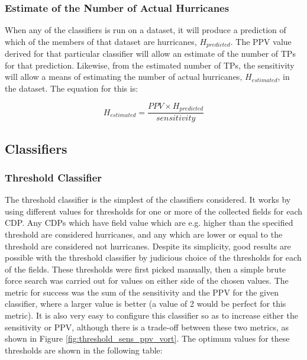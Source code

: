 \documentclass[pdftex,12pt,a4paper]{report}
\begin{document}
\subsubsection{Estimate of the Number of Actual Hurricanes}

When any of the classifiers is run on a dataset, it will produce a prediction of which of the
members of that dataset are hurricanes, $H_{predicted}$. The PPV value derived for that particular classifier will
allow an estimate of the number of TPs for that prediction. Likewise, from the estimated number of
TPs, the sensitivity will allow a means of estimating the number of actual hurricanes, $H_{estimated}$,
in the dataset. The equation for this is:

\begin{equation}
    H_{estimated} = \frac{PPV \times H_{predicted}}{sensitivity}
    \label{eqn:n_actual_hurricane}
\end{equation}

\subsection{Classifiers}

\subsubsection{Threshold Classifier}
The threshold classifier is the simplest of the classifiers considered. It works by using different
values for thresholds for one or more of the collected fields for each CDP. Any CDPs which have
field value which are e.g. higher than the specified threshold are considered hurricanes, and any
which are lower or equal to the threshold are considered not hurricanes. Despite its simplicity,
good results are possible with the threshold classifier by judicious choice of the thresholds for
each of the fields. These thresholds were first picked manually, then a simple brute force search
was carried out for values on either side of the chosen values. The metric for success was the sum
of the sensitivity and the PPV for the given classifier, where a larger value is better (a value of
2 would be perfect for this metric). It is also very easy to configure this classifier so as to
increase either the sensitivity or PPV, although there is a trade-off between these two metrics, as
shown in Figure \ref{fig:threshold_sens_ppv_vort}. The optimum values for these thresholds are shown
in the following table:
\end{document}
